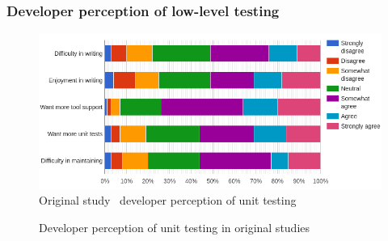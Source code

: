 \subsubsection{Developer perception of low-level testing}
    \begin{figure}[ht]
      \begin{center}
        \includegraphics[width=14.7cm]{images/perception-org.png}
        \caption{Original study~\cite{daka2014survey} developer perception of unit testing}
        \label{fig:TDD}
      \end{center}
    \end{figure}

    \begin{figure}[ht]%
        \centering
        \qquad
        \caption{Developer perception of unit testing in original studies}%
        \label{fig:example}%
    \end{figure}

